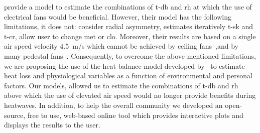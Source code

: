  provide a model to estimate the combinations of \ac{t-db} and \ac{rh} at which the use of electrical fans would be beneficial.
However, their model has the following limitations, it does not: consider radial asymmetry, estimates iteratively \ac{t-sk} and \ac{t-cr}, allow user to change \ac{met} or \ac{clo}.
Moreover, their results are based on a single air speed velocity 4.5~m/s which cannot be achieved by ceiling fans~\cite{Raftery2019},and by many pedestal fans~\cite{Yang2015a}.
Consequently, to overcome the above mentioned limitations, we are proposing the use of the heat balance model developed by~ to estimate heat loss and physiological variables as a function of environmental and personal factors.
Our models, allowed us to estimate the combinations of \ac{t-db} and \ac{rh} above which the use of elevated air speed would no longer provide benefits during heatwaves.
In addition, to help the overall community we developed an open-source, free to use, web-based online tool which provides interactive plots and displays the results to the user.

